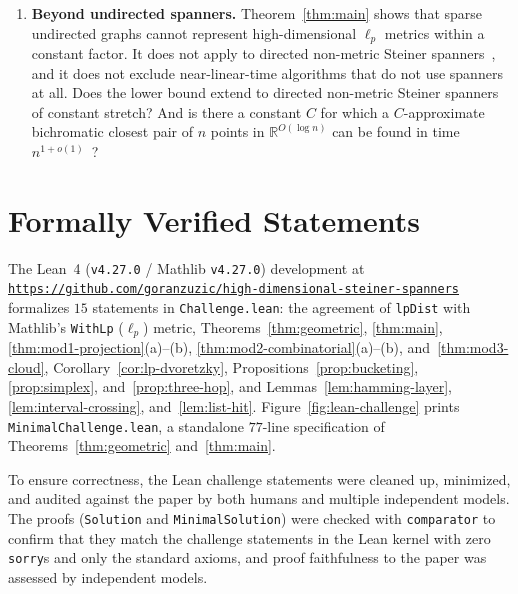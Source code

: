 \documentclass[11pt]{article}
\theoremstyle{definition}
\theoremstyle{remark}
\newcommand{\R}{\mathbb{R}}
\begin{document}
\begin{enumerate}[label=(\arabic*),leftmargin=2em]
  \item \textbf{Beyond undirected spanners.} Theorem~\ref{thm:main} shows that sparse undirected graphs cannot represent high-dimensional $\ell_p$ metrics within a constant factor. It does not apply to directed non-metric Steiner spanners~\cite{andoni2023subquadratic,jayaram2026near}, and it does not exclude near-linear-time algorithms that do not use spanners at all. Does the lower bound extend to directed non-metric Steiner spanners of constant stretch? And is there a constant $C$ for which a $C$-approximate bichromatic closest pair of $n$ points in $\R^{O(\log n)}$ can be found in time $n^{1 + o(1)}$~\cite{rubinstein2018hardness}?
\end{enumerate}




\clearpage
\appendix
\section{Formally Verified Statements}
\label{app:lean}

The Lean~4 (\texttt{v4.27.0} / Mathlib \texttt{v4.27.0}) development at \href{https://github.com/goranzuzic/high-dimensional-steiner-spanners}{\texttt{https://github.com/\allowbreak goranzuzic/\allowbreak high-\allowbreak dimensional-\allowbreak steiner-\allowbreak spanners}} formalizes $15$ statements in \texttt{Challenge.lean}: the agreement of \texttt{lpDist} with Mathlib's \texttt{WithLp} ($\ell_p$) metric, Theorems~\ref{thm:geometric}, \ref{thm:main}, \ref{thm:mod1-projection}(a)--(b), \ref{thm:mod2-combinatorial}(a)--(b), and~\ref{thm:mod3-cloud}, Corollary~\ref{cor:lp-dvoretzky}, Propositions~\ref{prop:bucketing}, \ref{prop:simplex}, and~\ref{prop:three-hop}, and Lemmas~\ref{lem:hamming-layer}, \ref{lem:interval-crossing}, and~\ref{lem:list-hit}. Figure~\ref{fig:lean-challenge} prints \texttt{MinimalChallenge.lean}, a standalone $77$-line specification of Theorems~\ref{thm:geometric} and~\ref{thm:main}.

To ensure correctness, the Lean challenge statements were cleaned up, minimized, and audited against the paper by both humans and multiple independent models. The proofs (\texttt{Solution} and \texttt{MinimalSolution}) were checked with \texttt{comparator} to confirm that they match the challenge statements in the Lean kernel with zero \texttt{sorry}s and only the standard axioms, and proof faithfulness to the paper was assessed by independent models.
\end{document}
